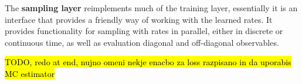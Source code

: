 The \textbf{sampling layer} reimplements much of the training layer, essentially it is an interface that provides a friendly way of working with the learned rates. It provides functionality for sampling with rates in parallel, either in discrete or continuous time, as well as evaluation diagonal and off-diagonal observables. 

\hl{TODO, redo at end, nujno omeni nekje enacbo za loss razpisano in da uporabis MC estimator}
